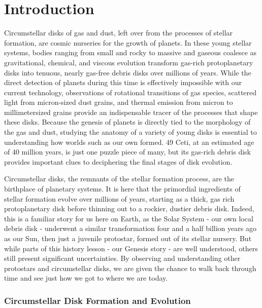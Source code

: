 \chapter{Introduction}



Circumstellar disks of gas and dust, left over from the processes of stellar formation,
are cosmic nurseries for the growth of planets. In these young stellar
systems, bodies ranging from small and rocky to massive and gaseous coalesce as
gravitational, chemical, and viscous evolution transform gas-rich protoplanetary
disks into tenuous, nearly gas-free debris disks over millions of years. While the
direct detection of planets during this time is effectively impossible with our current
technology, observations of rotational transitions of gas species, scattered light
from micron-sized dust grains, and thermal emission from micron to millimetersized
grains provide an indispensable tracer of the processes that shape these
disks. Because the genesis of planets is directly tied to the morphology of the
gas and dust, studying the anatomy of a variety of young disks is essential to
understanding how worlds such as our own formed. 49 Ceti, at an estimated age
of 40 million years, is just one puzzle piece of many, but its gas-rich debris disk
provides important clues to deciphering the final stages of disk evolution.


Circumstellar disks, the remnants of the stellar formation process, are the birthplace of planetary systems. It is here that the primordial ingredients of stellar formation evolve over millions of years, starting as a thick, gas rich protoplanetary disk before thinning out to a rockier, dustier debris disk. Indeed, this is a familiar story for us here on Earth, as the Solar System  - our own local debris disk - underwent a similar transformation four and a half billion years ago as our Sun, then just a juvenile protostar, formed out of its stellar nursery. But while parts of this history lesson - our Genesis story - are well understood, others still present significant uncertainties. By observing and understanding other protostars and circumstellar disks, we are given the chance to walk back through time and see just how we got to where we are today.




\subsection{Circumstellar Disk Formation and Evolution}

